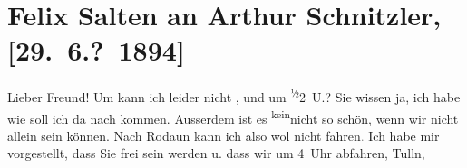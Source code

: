 

         
         \renewcommand{\erwaehntePersonen}{Personen: Adele Sandrock}
         \renewcommand{\erwaehnteOrte}{Orte: Rodaun, Tulln an der Donau, Wien}
         \renewcommand{\erwaehnteWerke}{}
               \section[Felix Salten an Arthur Schnitzler, {[}29. 6.? 1894{]}]{ Felix Salten an Arthur Schnitzler, {[}29. 6.? 1894{]}}\nopagebreak{}\rehead{ }\begin{ledgroupsized}[t]{13cm}\normalsize\beginnumbering \toendnotes[C]{\smallbreak\pagebreak[2]} 
\toendnotes[C]{\smallbreak}\pstart
           \noindent{}{\pb}Lieber Freund! Um \label{K_L03139-1v}\label{K_L03139-1h} kann ich leider nicht \label{K_L03139-2v}\label{K_L03139-2h}, und um \substVorne{}\textsuperscript{½}\substDazwischen{}2\substHinten{} U.? Sie wissen ja, ich habe \label{K_L03139-3v}\label{K_L03139-3h} wie soll ich da nach \label{T_L03139-1v}\label{T_L03139-1h} kommen.
               Ausserdem {\pb}ist es \substVorne{}\textsuperscript{kein}\substDazwischen{}nic\substHinten{}ht so schön, wenn wir nicht allein sein können.\pend
           \pstart
           Nach Rodaun kann ich also wol nicht
                  fahren\textcolor{gray}{.} Ich habe mir vorgestellt, dass Sie frei sein werden u.
               dass wir um 4 Uhr abfahren, Tulln,

\end{ledgroupsized}
